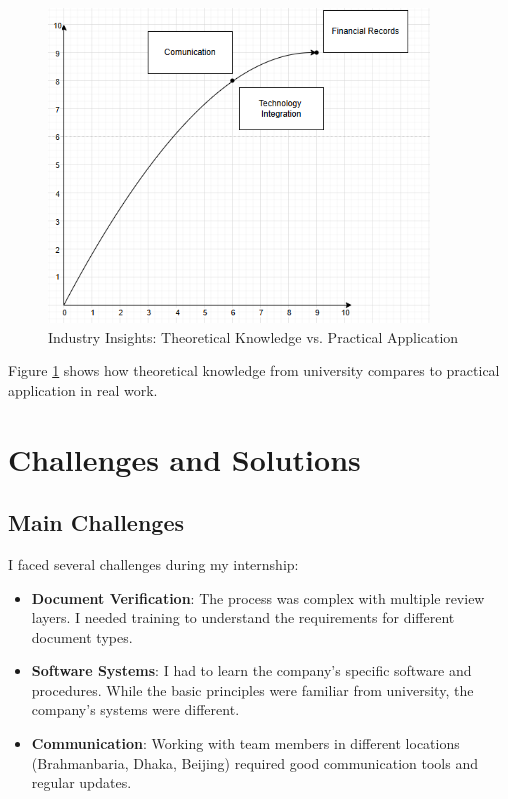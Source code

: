 \begin{figure}[H]
    \centering
    \includegraphics[width=0.9\textwidth]{assets/images/industry_insights_matrix.png}
    \caption{Industry Insights: Theoretical Knowledge vs. Practical Application}
    \label{fig:industry_insights_matrix}
\end{figure}

Figure \ref{fig:industry_insights_matrix} shows how theoretical knowledge from university compares to practical application in real work.

\vspace{0.5em}
\section{Challenges and Solutions}

\subsection{Main Challenges}
I faced several challenges during my internship:

\begin{itemize}[leftmargin=*, itemsep=0.25em]
    \item \textbf{Document Verification}: The process was complex with multiple review layers. I needed training to understand the requirements for different document types.
    \item \textbf{Software Systems}: I had to learn the company's specific software and procedures. While the basic principles were familiar from university, the company's systems were different.
    \item \textbf{Communication}: Working with team members in different locations (Brahmanbaria, Dhaka, Beijing) required good communication tools and regular updates.
\end{itemize}

